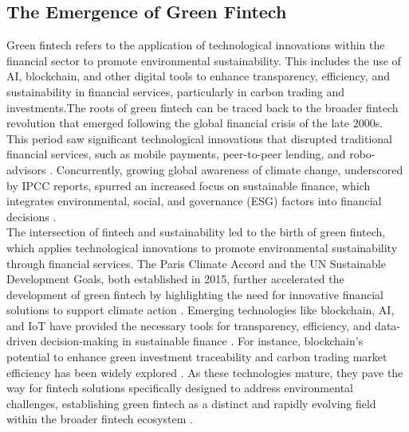 \documentclass[preprint,12pt]{elsarticle}
\begin{document}
\subsection{The Emergence of Green Fintech}
Green fintech refers to the application of technological innovations within the financial sector to promote environmental sustainability. This includes the use of AI, blockchain, and other digital tools to enhance transparency, efficiency, and sustainability in financial services, particularly in carbon trading and investments.The roots of green fintech can be traced back to the broader fintech revolution that emerged following the global financial crisis of the late 2000s. This period saw significant technological innovations that disrupted traditional financial services, such as mobile payments, peer-to-peer lending, and robo-advisors \citep{ref9}. Concurrently, growing global awareness of climate change, underscored by IPCC reports, spurred an increased focus on sustainable finance, which integrates environmental, social, and governance (ESG) factors into financial decisions \citep{ref10}.\\
The intersection of fintech and sustainability led to the birth of green fintech, which applies technological innovations to promote environmental sustainability through financial services. The Paris Climate Accord and the UN Sustainable Development Goals, both established in 2015, further accelerated the development of green fintech by highlighting the need for innovative financial solutions to support climate action \citep{ref13}. Emerging technologies like blockchain, AI, and IoT have provided the necessary tools for transparency, efficiency, and data-driven decision-making in sustainable finance \citep{ref14}. For instance, blockchain’s potential to enhance green investment traceability and carbon trading market efficiency has been widely explored \citep{ref15}. As these technologies mature, they pave the way for fintech solutions specifically designed to address environmental challenges, establishing green fintech as a distinct and rapidly evolving field within the broader fintech ecosystem \citep{ref16}.
\end{document}

